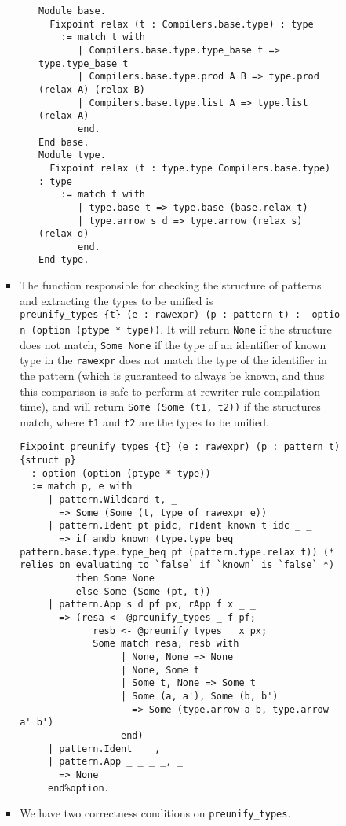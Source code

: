 \begin{itemize}
\begin{itemize}
\begin{itemize}
\begin{itemize}
\begin{itemize}
\begin{verbatim}
Module base.
  Fixpoint relax (t : Compilers.base.type) : type
    := match t with
       | Compilers.base.type.type_base t => type.type_base t
       | Compilers.base.type.prod A B => type.prod (relax A) (relax B)
       | Compilers.base.type.list A => type.list (relax A)
       end.
End base.
Module type.
  Fixpoint relax (t : type.type Compilers.base.type) : type
    := match t with
       | type.base t => type.base (base.relax t)
       | type.arrow s d => type.arrow (relax s) (relax d)
       end.
End type.
\end{verbatim}
        \end{itemize}
      \item
        The function responsible for checking the structure of patterns
        and extracting the types to be unified is
        \texttt{preunify\_types\ \{t\}\ (e\ :\ rawexpr)\ (p\ :\ pattern\ t)\ :\ \ option\ (option\ (ptype\ *\ type))}.
        It will return \texttt{None} if the structure does not match,
        \texttt{Some\ None} if the type of an identifier of known type
        in the \texttt{rawexpr} does not match the type of the
        identifier in the pattern (which is guaranteed to always be
        known, and thus this comparison is safe to perform at
        rewriter-rule-compilation time), and will return
        \texttt{Some\ (Some\ (t1,\ t2))} if the structures match, where
        \texttt{t1} and \texttt{t2} are the types to be unified.

\begin{verbatim}
Fixpoint preunify_types {t} (e : rawexpr) (p : pattern t) {struct p}
  : option (option (ptype * type))
  := match p, e with
     | pattern.Wildcard t, _
       => Some (Some (t, type_of_rawexpr e))
     | pattern.Ident pt pidc, rIdent known t idc _ _
       => if andb known (type.type_beq _ pattern.base.type.type_beq pt (pattern.type.relax t)) (* relies on evaluating to `false` if `known` is `false` *)
          then Some None
          else Some (Some (pt, t))
     | pattern.App s d pf px, rApp f x _ _
       => (resa <- @preunify_types _ f pf;
             resb <- @preunify_types _ x px;
             Some match resa, resb with
                  | None, None => None
                  | None, Some t
                  | Some t, None => Some t
                  | Some (a, a'), Some (b, b')
                    => Some (type.arrow a b, type.arrow a' b')
                  end)
     | pattern.Ident _ _, _
     | pattern.App _ _ _ _, _
       => None
     end%option.
\end{verbatim}
      \item
        We have two correctness conditions on \texttt{preunify\_types}.


\end{itemize}
\end{itemize}
\end{itemize}
\end{itemize}
